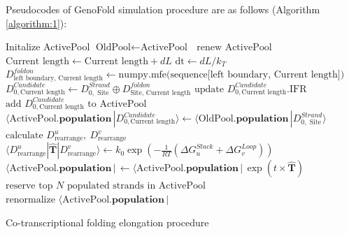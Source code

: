 \documentclass[11pt, a4paper]{article}
\begin{document}
Pseudocodes of GenoFold simulation procedure are as follows (Algorithm \ref{algorithm:1}):

\begin{algorithm}
  \begin{algorithmic}[1]
    \State Initalize ActivePool
      \State $\text{OldPool} \gets \text{ActivePool }$
      \State $\text{renew ActivePool }$
      \State $\text{Current length} \gets \text{Current length} + dL$
      \State $\text{dt} \gets dL / k_T$ 
        \State $D^{foldon}_{\text{left boundary}, \text{ Current length}} \gets \text{numpy.mfe(sequence[left boundary, Current length]})$
      \EndFor
          \State $D^{Candidate}_{0,\text{Current length}} \gets D^{Strand}_{0, \text{ Site}} \oplus D^{foldon}_{\text{Site}, \text{ Current length}}$
            \State $\text{update $D^{Candidate}_{0,\text{Current length}}$.IFR}$
          \Else
            \State $\text{add $D^{Candidate}_{0,\text{Current length}}$ to ActivePool}$
          \EndIf
            \State $\langle \text{ActivePool}.\textbf{population}\,|D^{Candidate}_{0,\text{Current length}}\rangle \gets \langle \text{OldPool}.\textbf{population}\,|D^{Strand}_{0, \text{ Site}}\rangle$
          \EndIf
        \EndFor
      \EndFor
        \State $\text{calculate  } D^{u}_{\text{rearrange}} ,\ D^{v}_{\text{rearrange}}$
        \State $\langle D^{u}_{\text{rearrange}} | \hat{\mathbf{T}} |D^{v}_{\text{rearrange}} \rangle \gets k_0 \exp(-\frac{1}{RT}(\Delta G^{Stack}_{u}+\Delta G^{Loop}_{v}) )$
      \EndFor
      \State $\langle \text{ActivePool}.\textbf{population}\,|\, \gets \langle \text{ActivePool}.\textbf{population}\,|\, \exp(t\times\hat{\mathbf{T}}) $
      \State $\text{reserve top $N$ populated strands in ActivePool}$
      \State $\text{renormalize }\langle \text{ActivePool}.\textbf{population}\,|$
    \EndWhile
  \end{algorithmic}
\caption{Co-transcriptional folding elongation procedure}\label{algorithm:1}
\end{algorithm}
\end{document}
